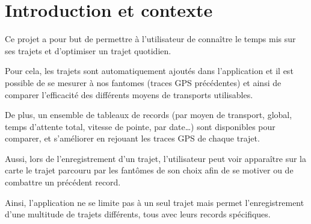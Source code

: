 \chapter{Introduction et contexte}


Ce projet a pour but de permettre à l’utilisateur de connaître le temps mis sur ses trajets et d’optimiser un trajet quotidien.

Pour cela, les trajets sont automatiquement ajoutés dans l’application et il est possible de se mesurer à nos \glspl{fantome} (traces \gls{GPS} précédentes) et ainsi de comparer l'efficacité des différents moyens de transports utilisables.

De plus, un ensemble de tableaux de records (par moyen de transport, global, temps d’attente total, vitesse de pointe, par date…) sont disponibles pour comparer, et s’améliorer en rejouant les traces \gls{GPS} de chaque trajet.

Aussi, lors de l’enregistrement d’un trajet, l’utilisateur peut voir apparaître sur la carte le trajet parcouru par les fantômes de son choix afin de se motiver ou de combattre un précédent record.

Ainsi, l’application ne se limite pas à un seul trajet mais permet l’enregistrement d’une multitude de trajets différents, tous avec leurs records spécifiques.

